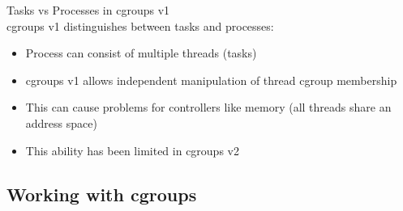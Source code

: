 \multend

\begin{concept}{Tasks vs Processes in cgroups v1}\\
    cgroups v1 distinguishes between tasks and processes:
    \begin{itemize}
        \item Process can consist of multiple threads (tasks)
        \item cgroups v1 allows independent manipulation of thread cgroup membership
        \item This can cause problems for controllers like memory (all threads share an address space)
        \item This ability has been limited in cgroups v2
    \end{itemize}
\end{concept}

\subsection{Working with cgroups}

